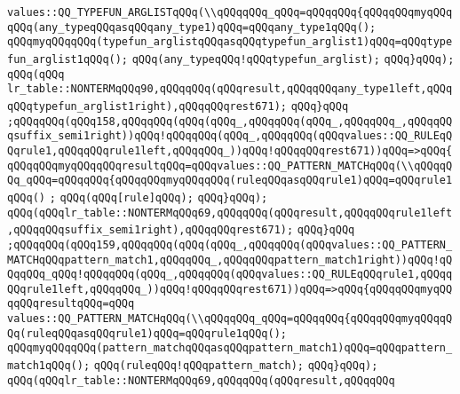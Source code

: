 \verb|values::QQ_TYPEFUN_ARGLISTqQQq(\\qQQqqQQq_qQQq=qQQqqQQq{qQQqqQQqmyqQQqqQQq(any_typeqQQqasqQQqany_type1)qQQq=qQQqany_type1qQQq();|\newline
\verb|qQQqmyqQQqqQQq(typefun_arglistqQQqasqQQqtypefun_arglist1)qQQq=qQQqtypefun_arglist1qQQq();|\newline
\verb|qQQq(any_typeqQQq!qQQqtypefun_arglist);|\newline
\verb|qQQq}qQQq);|\newline
\verb|qQQq(qQQq|\newline
\verb|lr_table::NONTERMqQQq90,qQQqqQQq(qQQqresult,qQQqqQQqany_type1left,qQQqqQQqtypefun_arglist1right),qQQqqQQqrest671);|\newline
\verb|qQQq}qQQq|\newline
\verb|;qQQqqQQq(qQQq158,qQQqqQQq(qQQq(qQQq_,qQQqqQQq(qQQq_,qQQqqQQq_,qQQqqQQqsuffix_semi1right))qQQq!qQQqqQQq(qQQq_,qQQqqQQq(qQQqvalues::QQ_RULEqQQqrule1,qQQqqQQqrule1left,qQQqqQQq_))qQQq!qQQqqQQqrest671))qQQq=>qQQq{qQQqqQQqmyqQQqqQQqresultqQQq=qQQqvalues::QQ_PATTERN_MATCHqQQq(\\qQQqqQQq_qQQq=qQQqqQQq{qQQqqQQqmyqQQqqQQq(ruleqQQqasqQQqrule1)qQQq=qQQqrule1qQQq()|\newline
\verb|;|\newline
\verb|qQQq(qQQq[rule]qQQq);|\newline
\verb|qQQq}qQQq);|\newline
\verb|qQQq(qQQqlr_table::NONTERMqQQq69,qQQqqQQq(qQQqresult,qQQqqQQqrule1left,qQQqqQQqsuffix_semi1right),qQQqqQQqrest671);|\newline
\verb|qQQq}qQQq|\newline
\verb|;qQQqqQQq(qQQq159,qQQqqQQq(qQQq(qQQq_,qQQqqQQq(qQQqvalues::QQ_PATTERN_MATCHqQQqpattern_match1,qQQqqQQq_,qQQqqQQqpattern_match1right))qQQq!qQQqqQQq_qQQq!qQQqqQQq(qQQq_,qQQqqQQq(qQQqvalues::QQ_RULEqQQqrule1,qQQqqQQqrule1left,qQQqqQQq_))qQQq!qQQqqQQqrest671))qQQq=>qQQq{qQQqqQQqmyqQQqqQQqresultqQQq=qQQq|\newline
\verb|values::QQ_PATTERN_MATCHqQQq(\\qQQqqQQq_qQQq=qQQqqQQq{qQQqqQQqmyqQQqqQQq(ruleqQQqasqQQqrule1)qQQq=qQQqrule1qQQq();|\newline
\verb|qQQqmyqQQqqQQq(pattern_matchqQQqasqQQqpattern_match1)qQQq=qQQqpattern_match1qQQq();|\newline
\verb|qQQq(ruleqQQq!qQQqpattern_match);|\newline
\verb|qQQq}qQQq);|\newline
\verb|qQQq(qQQqlr_table::NONTERMqQQq69,qQQqqQQq(qQQqresult,qQQqqQQq|\newline

